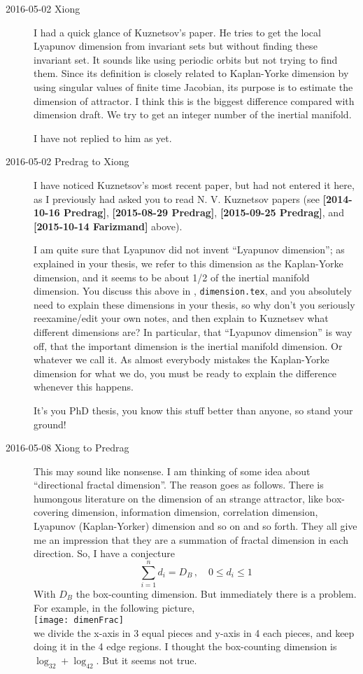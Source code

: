 \begin{description}
\item[2016-05-02 Xiong]
I had a quick glance of Kuznetsov's paper. He tries to get the local
Lyapunov dimension from invariant sets but without finding these
invariant set. It sounds like using periodic orbits but not trying to
find them.  Since its definition is closely related to Kaplan-Yorke
dimension by using singular values of finite time Jacobian, its purpose
is to estimate the dimension of attractor. I think this is the biggest
difference compared with dimension draft. We try to get an integer number
of the inertial manifold.

I have not replied to him as yet.

\item[2016-05-02 Predrag to Xiong]
I have noticed Kuznetsov's most recent paper, but had not
entered it here, as I previously had asked you to read
{N. V. Kuznetsov} papers (see {\bf [2014-10-16 Predrag]}, {\bf
[2015-08-29 Predrag]}, {\bf [2015-09-25 Predrag]}, and {\bf [2015-10-14
Farizmand]} above).

I am quite sure that Lyapunov did not invent ``Lyapunov dimension''; as
explained in your thesis, we refer to this dimension as the Kaplan-Yorke
dimension, and it seems to be about 1/2 of the
inertial manifold dimension. You discuss this above in
, \texttt{dimension.tex}, and you absolutely need
to explain these dimensions in your thesis, so why don't you seriously
reexamine/edit your own notes, and then explain  to Kuznetsev what
different dimensions are? In particular, that ``Lyapunov dimension'' is
way off, that the important dimension is the inertial manifold dimension.
Or whatever we call it. As almost everybody mistakes the Kaplan-Yorke
dimension for what we do, you must be ready to explain the difference
whenever this happens.

It's you PhD thesis, you know this stuff better
than anyone, so stand your ground!

\item[2016-05-08 Xiong to Predrag]
This may sound like nonsense.
I am thinking of some idea about ``directional fractal dimension''.
The reason goes as follows.
There is humongous literature on the dimension of an strange attractor,
like box-covering dimension, information dimension, correlation
dimension, Lyapunov (Kaplan-Yorker) dimension  and so on and so forth.
They all give me an impression that they are a summation of fractal
dimension in each direction. So, I have a conjecture
\[
  \sum_{i=1}^n d_i = D_B\,,\quad  0 \le d_i \le 1
\]
With $D_B$ the box-counting dimension.
But immediately there is a problem.
For example, in the following picture,
\\{\centering
\texttt{[image: dimenFrac]}
}\\
we divide the x-axis in 3 equal pieces and y-axis in 4 each pieces,
and keep doing it in the 4 edge regions.
I thought the box-counting dimension is
$\log_32 + \log_42$. But it seems not true.


\end{description}
